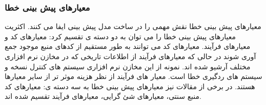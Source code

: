 \subsubsection{معیارهای پیش بینی خطا}

معیارهای پیش بینی خطا نقش مهمی را در ساخت مدل پیش بینی ایفا می کنند. اکثریت معیارهای پیش بینی خطا را می توان به دو دسته ی تقسیم کرد: معیارهای کد و معیارهای فرآیند. معیارهای کد می توانند به طور مستقیم از کدهای منبع موجود جمع آوری شوند در حالی که معیارهای فرآیند  از اطلاعات تاریخی که در مخازن نرم افزاری مختلف آرشیو شده اند. نمونه از این مخازن نرم افزاری سیستم های کنترل نسخه و سیستم های ردگیری خطا است. معیار های فرآیند از نظر هزینه موثر تر از سایر معیارها هستند\cite{arisholm2010systematic}. در برخی از مقالات نیز معیارهای  پیش بینی خطا به سه دسته ی: معیارهای کد منبع سنتی، معیارهای شئ گرایی، معیارهای فرآیند تقسیم شده اند\cite{radjenovic2013software}.\\

